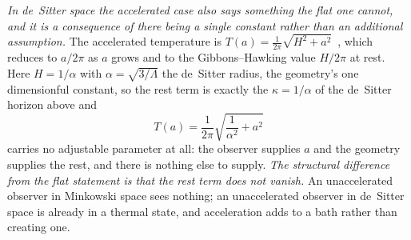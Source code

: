 \documentclass[11pt,a4paper]{article}
\theoremstyle{plain}
\theoremstyle{remark}
\begin{document}
\emph{In de~Sitter space the accelerated case also says something the flat one cannot, and it is a consequence
of there being a single constant rather than an additional assumption.} The accelerated
temperature is $T(a)=\tfrac{1}{2\pi}\sqrt{H^{2}+a^{2}}$~\cite{NarnhoferPeterThirring1996, DeserLevin1997},
which reduces to $a/2\pi$ as $a$ grows and to the Gibbons--Hawking value $H/2\pi$ at rest. Here $H=1/\alpha$
with $\alpha=\sqrt{3/\Lambda}$ the de~Sitter radius, the geometry's one dimensionful constant, so the rest term
is exactly the $\kappa=1/\alpha$ of the de~Sitter horizon above and
\begin{equation}\label{eq:unruh-ds}
T(a)=\frac{1}{2\pi}\sqrt{\frac{1}{\alpha^{2}}+a^{2}}
\end{equation}
carries no adjustable parameter at all: the observer supplies $a$ and the geometry supplies the rest, and
there is nothing else to supply. \emph{The structural difference from the flat statement is that the rest term
does not vanish.} An unaccelerated observer in Minkowski space sees nothing; an unaccelerated observer in
de~Sitter space is already in a thermal state, and acceleration adds to a bath rather than creating one.
\end{document}
